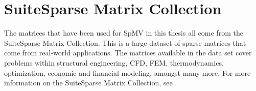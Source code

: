 \section{SuiteSparse Matrix Collection}
The matrices that have been used for SpMV in this thesis all come from the SuiteSparse Matrix Collection. This is a large dataset of sparse matrices that come from real-world applications. The matrices available in the data set cover problems within structural engineering, CFD, FEM, thermodynamics, optimization, economic and financial modeling, amongst many more. For more information on the SuiteSparse Matrix Collection, see \cite{10.1145/2049662.2049663}.
